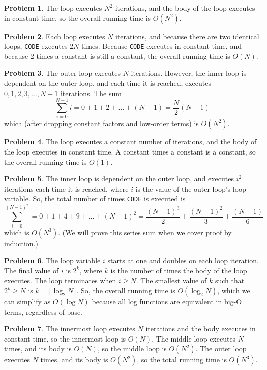 \documentclass{article}
\begin{document}
{\bf Problem 1}.  The loop executes $N^2$ iterations, and the body of the loop
executes in constant time, so the overall running time is
$O(N^2)$.

{\bf Problem 2}. Each loop executes $N$ iterations, and because there are
two identical loops, {\tt CODE} executes $2N$ times.  Because {\tt CODE}
executes in constant time, and because 2 times a constant is still a
constant, the overall running time is $O(N)$.

{\bf Problem 3}. The outer loop executes $N$ iterations.  However, the
inner loop is dependent on the outer loop, and each time it is reached,
executes $0, 1, 2, 3, \ldots, N-1$ iterations.  The sum
\[\sum_{i=0}^{N-1}{i} = 0 + 1 + 2 + \ldots + (N-1) = \frac{N}{2}(N-1)\]
which (after dropping constant factors and low-order terms)
is $O(N^2)$.

{\bf Problem 4}.  The loop executes a constant number of iterations,
and the body of the loop executes in constant time.  A constant times
a constant is a constant, so the overall running time is $O(1)$.

{\bf Problem 5}. The inner loop is dependent on the outer loop, and executes
$i^2$ iterations each time it is reached, where $i$ is the value of the
outer loop's loop variable.  So, the total number of times
{\tt CODE} is executed is
\[\sum_{i=0}^{(N-1)^2} = 0 + 1 + 4 + 9 + \ldots + (N-1)^2 = \frac{(N-1)^3}{2} + \frac{(N-1)^2}{3} + \frac{(N-1)}{6}\]
which is $O(N^3)$.  (We will prove this series sum when we cover proof by induction.)

{\bf Problem 6}. The loop variable $i$ starts at one and doubles on each loop iteration.
The final value of $i$ is $2^k$, where $k$ is the number of times the body of the
loop executes.  The loop terminates when $i\ge N$.  The smallest value of $k$
such that $2^k \ge N$ is $k = \lceil{\log _{2}{N}}\rceil$.  So, the overall
running time is $O(\log _{2}{N})$, which we can simplify as
$O(\log N)$ because all log functions are equivalent in big-O terms,
regardless of base.

{\bf Problem 7}. The innermost loop executes $N$ iterations and the body executes
in constant time, so the innermost loop is $O(N)$.  The middle loop executes
$N$ times, and its body is $O(N)$, so the middle loop is $O(N^2)$.
The outer loop executes $N$ times, and its body is $O(N^2)$, so the total
running time is $O(N^3)$.
\end{document}
